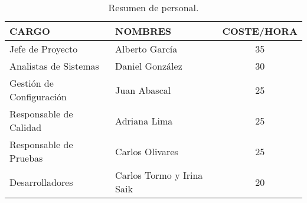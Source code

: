 \begin{table}[H]
\begin{center}
\begin{tabular}{l l c}

\textbf{CARGO} & \textbf{NOMBRES} & \textbf{COSTE/HORA}\\ \hline \hline
Jefe de Proyecto & Alberto García & 35  \\
Analistas de Sistemas & Daniel González & 30\\
Gestión de Configuración & Juan Abascal & 25\\
Responsable de Calidad & Adriana Lima & 25\\
Responsable de Pruebas & Carlos Olivares & 25\\
Desarrolladores & Carlos Tormo y  Irina Saik & 20\\ \hline \hline
\end{tabular}
\caption{Resumen de personal.}
\label{tab:personal}
\end{center}
\end{table}



